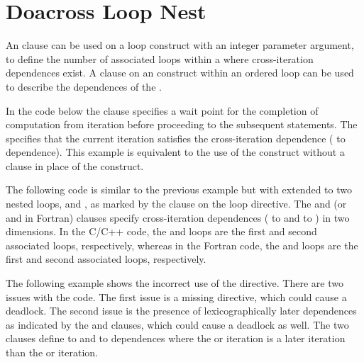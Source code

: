 \pagebreak
\section{Doacross Loop Nest}
\label{sec:doacross}

An  clause can be used on a loop construct with an integer
parameter argument, to define the number of associated loops within 
a  where cross-iteration dependences exist.
A  clause on an  construct within an ordered 
loop can be used to describe the dependences of the . 

In the code below
the  clause specifies a wait point for the completion 
of computation from iteration  before proceeding to the subsequent
statements. The  specifies that the current iteration
 satisfies the cross-iteration dependence ( to 
 dependence). This example is equivalent 
to the use of the  construct without a clause in place of 
the   construct.



The following code is similar to the previous example but with 
 extended to two nested loops,  and , 
as marked by the  clause on the loop directive. 
The  and  (or
 and  in Fortran) clauses 
specify cross-iteration dependences ( to  and 
 to ) in two dimensions.
In the C/C++ code, the  and  loops are the first and
second associated loops, respectively, whereas
in the Fortran code, the  and  loops are the first and
second associated loops, respectively.




The following example shows the incorrect use of the  
 directive.  There are two issues with the code.  The first
issue is a missing   directive,
which could cause a deadlock.  The second issue is the presence of
lexicographically later dependences as indicated by the
 and  clauses,
which could cause a deadlock as well.
The two clauses define  to  and  to 
dependences where the  or  iteration is a later iteration
than the  or  iteration.

